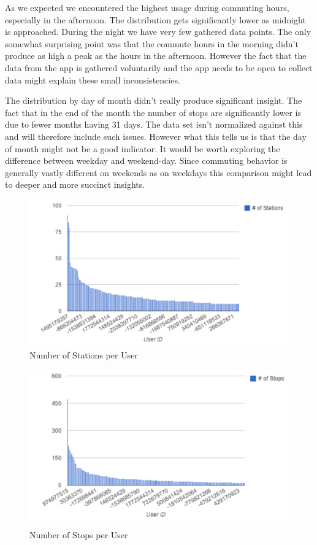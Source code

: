 As we expected we encountered the highest usage during commuting hours, especially in the afternoon. The distribution gets significantly lower as midnight is approached. During the night we have very few gathered data points. The only somewhat surprising point was that the commute hours in the morning didn't produce as high a peak as the hours in the afternoon. However the fact that the data from the app is gathered voluntarily and the app needs to be open to collect data might explain these small inconsistencies.

The distribution by day of month didn't really produce significant insight. The fact that in the end of the month the number of stops are significantly lower is due to fewer months having 31 days. The data set isn't normalized against this and will therefore include such issues. However what this tells us is that the day of month might not be a good indicator. It would be worth exploring the difference between weekday and weekend-day. Since commuting behavior is generally vastly different on weekends as on weekdays this comparison might lead to deeper and more succinct insights.

\begin{figure}[!ht]
	\caption{Number of Stations per User}
	\centering
	\includegraphics[width=1.0\textwidth]{charts/different_stations_per_user}
\end{figure}


\begin{figure}[!ht]
	\caption{Number of Stops per User}
	\centering
	\includegraphics[width=1.0\textwidth]{charts/stops_per_user}
\end{figure}

